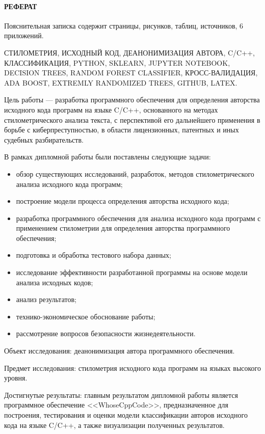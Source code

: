 
\newpage
{}
\paragraph{\hfill РЕФЕРАТ \hfill}
Пояснительная записка содержит  страницы,  рисунков,  таблиц,  источников,
6 приложений.


СТИЛОМЕТРИЯ, ИСХОДНЫЙ КОД, ДЕАНОНИМИЗАЦИЯ АВТОРА, C/C++, КЛАССИФИКАЦИЯ, PYTHON, SKLEARN, JUPYTER NOTEBOOK, DECISION
TREES, RANDOM FOREST CLASSIFIER, КРОСС-ВАЛИДАЦИЯ, ADA BOOST, EXTREMLY RANDOMIZED TREES, GITHUB, LATEX.

Цель работы --- разработка программного обеспечения для определения авторства исходного кода программ
на языке C/C++, основанного на методах стилометрического анализа текста, с перспективой его
дальнейшего применения в борьбе с киберпреступностью, в области лицензионных, патентных и иных судебных разбирательств.

В рамках дипломной работы были поставлены следующие задачи: 
\begin{itemize}
  \item обзор существующих исследований, разработок, методов стилометрического анализа исходного кода программ;
\item построение модели процесса определения авторства исходного кода;
  \item разработка программного обеспечения для анализа исходного кода программ с применением стилометрии для
определения авторства программного обеспечения;
  \item подготовка и обработка тестового набора данных;
  \item исследование эффективности разработанной программы на основе модели анализа исходных кодов;
  \item анализ результатов;
  \item технико-экономическое обоснование работы;
  \item рассмотрение вопросов безопасности жизнедеятельности.
\end{itemize}

Объект исследования: деанонимизация автора программного обеспечения. 

Предмет исследования: стилометрия исходного кода программ на языках высокого уровня.

Достигнутые результаты: главным результатом дипломной работы является 
программное обеспечение <<WhoseCppCode>>, предназначенное для построения,
тестирования и оценки модели классификации авторов исходного кода на языке C/C++,
а также визуализации полученных результатов.

